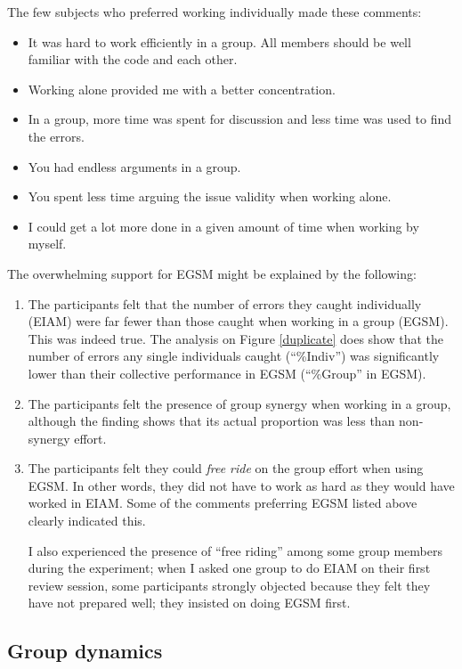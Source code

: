 The few subjects who preferred working individually made these
comments: 
\begin{itemize}
\item It was hard to work efficiently in a group. All members should
be well familiar with the code and each other.
\item Working alone provided me with a better concentration.
\item In a group, more time was spent for discussion and less time was
used to find the errors.
\item You had endless arguments in a group.
\item You spent less time arguing the issue validity when working alone. 
\item I could get a lot more done in a given amount of time when working
by myself.
\end{itemize}

The overwhelming support for EGSM might be explained by the
following:
\begin{enumerate}
\item The participants felt that the number of errors they caught
individually (EIAM) were far fewer than those caught when working in a
group (EGSM). This was indeed true. The analysis on Figure 
\ref{duplicate} does show that the number of errors any single
individuals 
caught (``\%Indiv'') was significantly lower than their collective
performance in EGSM (``\%Group'' in EGSM).

\item The participants felt the presence of group synergy
when working in a group, although the finding shows that
its actual proportion was less than non-synergy effort.

\item The participants felt they could {\it free ride} on the group
effort when using EGSM.  In other words, they did not have to work as
hard as they would have worked in EIAM. Some of the comments
preferring EGSM listed above clearly indicated this.

I also experienced the presence of ``free riding'' among
some group members during the experiment; when I asked one group to do
EIAM on their first review session, some participants strongly
objected because they felt they have not prepared well; they insisted
on doing EGSM first.

\end{enumerate}


\subsection{Group dynamics}


